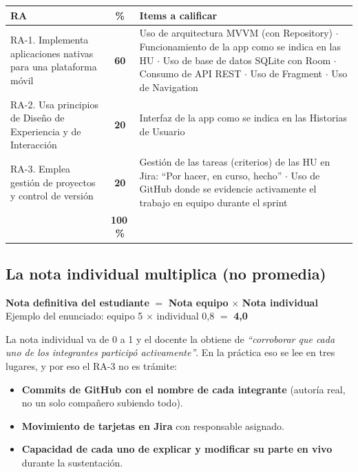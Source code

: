 \documentclass[11pt,letterpaper]{article}
\begin{document}
\begin{center}
\begin{xltabular}{\linewidth}{@{}>{\raggedright\arraybackslash}p{5.7cm} c >{\raggedright\arraybackslash}X@{}}
\toprule
\textbf{RA} & \textbf{\%} & \textbf{Items a calificar}\\
\midrule
\endhead
\bottomrule
\endlastfoot
{}
RA-1. Implementa aplicaciones nativas para una plataforma m\'ovil & \textbf{60} &
Uso de arquitectura MVVM (con Repository) $\cdot$ Funcionamiento de la app como se
indica en las HU $\cdot$ Uso de base de datos SQLite con Room $\cdot$ Consumo de
API REST $\cdot$ Uso de Fragment $\cdot$ Uso de Navigation\\
RA-2. Usa principios de Dise\~no de Experiencia y de Interacci\'on & \textbf{20} &
Interfaz de la app como se indica en las Historias de Usuario\\
RA-3. Emplea gesti\'on de proyectos y control de versi\'on & \textbf{20} &
Gesti\'on de las tareas (criterios) de las HU en Jira: ``Por hacer, en curso,
hecho'' $\cdot$ Uso de GitHub donde se evidencie activamente el trabajo en
equipo durante el sprint\\
\midrule
{} & \textbf{100\,\%}\\
\end{xltabular}
\end{center}

\subsection{La nota individual multiplica (no promedia)}

\begin{tcolorbox}[colback=soft,colframe=pink,boxrule=0.6pt,arc=3pt]
\centering\sffamily
\textbf{Nota definitiva del estudiante} $=$ \textbf{Nota equipo} $\times$ \textbf{Nota individual}\\[3pt]
{\footnotesize\color{muted}Ejemplo del enunciado: equipo 5 $\times$ individual 0,8 $=$ \textbf{4,0}}
\end{tcolorbox}

La nota individual va de 0 a 1 y el docente la obtiene de
\emph{``corroborar que cada uno de los integrantes particip\'o activamente''}.
En la pr\'actica eso se lee en tres lugares, y por eso el RA-3 no es tr\'amite:

\begin{itemize}[leftmargin=1.4em,itemsep=2pt]
  \item \textbf{Commits de GitHub con el nombre de cada integrante} (autor\'ia real,
        no un solo compa\~nero subiendo todo).
  \item \textbf{Movimiento de tarjetas en Jira} con responsable asignado.
  \item \textbf{Capacidad de cada uno de explicar y modificar su parte en vivo}
        durante la sustentaci\'on.
\end{itemize}
\end{document}
